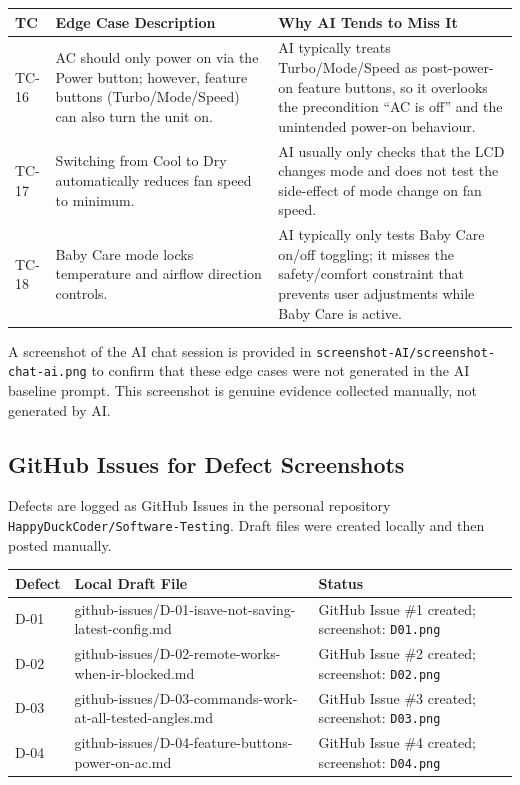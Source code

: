 \documentclass[12pt, a4paper]{article}
\begin{document}
\begin{table}[h!]
\centering
\begin{tabularx}{\textwidth}{@{} C{1.2cm} X L{5cm} @{}}
\toprule
{}
\textbf{TC} & \textbf{Edge Case Description} & \textbf{Why AI Tends to Miss It} \\
\midrule
TC-16 & AC should only power on via the Power button; however, feature buttons (Turbo/Mode/Speed) can also turn the unit on. & AI typically treats Turbo/Mode/Speed as post-power-on feature buttons, so it overlooks the precondition ``AC is off'' and the unintended power-on behaviour. \\
TC-17 & Switching from Cool to Dry automatically reduces fan speed to minimum. & AI usually only checks that the LCD changes mode and does not test the side-effect of mode change on fan speed. \\
TC-18 & Baby Care mode locks temperature and airflow direction controls. & AI typically only tests Baby Care on/off toggling; it misses the safety/comfort constraint that prevents user adjustments while Baby Care is active. \\
\bottomrule
\end{tabularx}
\end{table}

A screenshot of the AI chat session is provided in \texttt{screenshot-AI/screenshot-chat-ai.png} to confirm that these edge cases were not generated in the AI baseline prompt. This screenshot is genuine evidence collected manually, not generated by AI.

\subsection{GitHub Issues for Defect Screenshots}

Defects are logged as GitHub Issues in the personal repository \texttt{HappyDuckCoder/Software-Testing}. Draft files were created locally and then posted manually.

\begin{table}[h!]
\centering
\begin{tabularx}{\textwidth}{@{} C{1.2cm} X L{5.5cm} @{}}
\toprule
{}
\textbf{Defect} & \textbf{Local Draft File} & \textbf{Status} \\
\midrule
D-01 & {\small\ttfamily github-issues/D-01-isave-not-saving-\allowbreak latest-config.md} & GitHub Issue \#1 created; screenshot: \texttt{D01.png} \\
D-02 & {\small\ttfamily github-issues/D-02-remote-works-when-\allowbreak ir-blocked.md} & GitHub Issue \#2 created; screenshot: \texttt{D02.png} \\
D-03 & {\small\ttfamily github-issues/D-03-commands-work-at-\allowbreak all-tested-angles.md} & GitHub Issue \#3 created; screenshot: \texttt{D03.png} \\
D-04 & {\small\ttfamily github-issues/D-04-feature-buttons-\allowbreak power-on-ac.md} & GitHub Issue \#4 created; screenshot: \texttt{D04.png} \\
\bottomrule
\end{tabularx}
\end{table}
\end{document}
